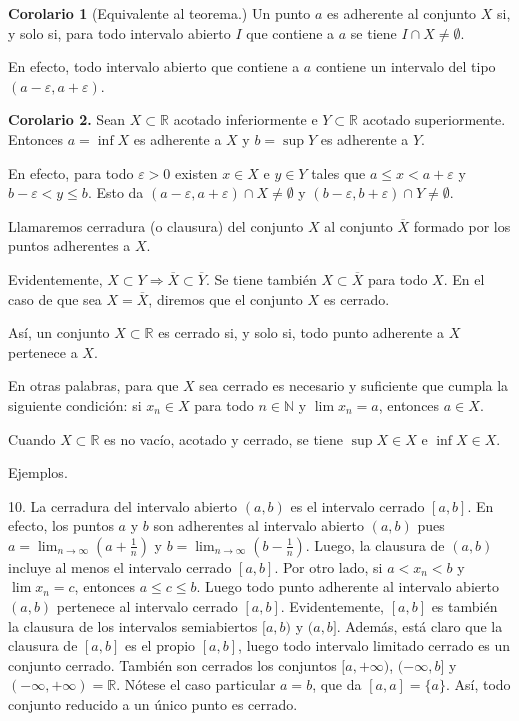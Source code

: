 \documentclass[12pt,oneside]{book}
\begin{document}
\textbf{Corolario 1} (Equivalente al teorema.) Un punto \( a \) es adherente al conjunto \( X \) si, y solo si, para todo intervalo abierto \( I \) que contiene a \( a \) se tiene \( I \cap X \neq \emptyset \).

En efecto, todo intervalo abierto que contiene a \( a \) contiene un intervalo del tipo \( (a - \varepsilon, a + \varepsilon) \).

\textbf{Corolario 2.} Sean \( X \subset \mathbb{R} \) acotado inferiormente e \( Y \subset \mathbb{R} \) acotado superiormente. Entonces \( a = \inf X \) es adherente a \( X \) y \( b = \sup Y \) es adherente a \( Y \).

En efecto, para todo \( \varepsilon > 0 \) existen \( x \in X \) e \( y \in Y \) tales que \( a \leq x < a + \varepsilon \) y \( b - \varepsilon < y \leq b \). Esto da \( (a - \varepsilon, a + \varepsilon) \cap X \neq \emptyset \) y \( (b - \varepsilon, b + \varepsilon) \cap Y \neq \emptyset \).

Llamaremos cerradura (o clausura) del conjunto \( X \) al conjunto \( \overline{X} \) formado por los puntos adherentes a \( X \).

Evidentemente, \( X \subset Y \Rightarrow \overline{X} \subset \overline{Y} \). Se tiene también \( X \subset \overline{X} \) para todo \( X \). En el caso de que sea \( X = \overline{X} \), diremos que el conjunto \( X \) es cerrado.

Así, un conjunto \( X \subset \mathbb{R} \) es cerrado si, y solo si, todo punto adherente a \( X \) pertenece a \( X \).

En otras palabras, para que \( X \) sea cerrado es necesario y suficiente que cumpla la siguiente condición: si \( x_n \in X \) para todo \( n \in \mathbb{N} \) y \( \lim x_n = a \), entonces \( a \in X \).

Cuando \( X \subset \mathbb{R} \) es no vacío, acotado y cerrado, se tiene \( \sup X \in X \) e \( \inf X \in X \).

Ejemplos.

10. La cerradura del intervalo abierto \( (a, b) \) es el intervalo cerrado \( [a, b] \). En efecto, los puntos \( a \) y \( b \) son adherentes al intervalo abierto \( (a, b) \) pues \( a = \lim_{n \to \infty} \left( a + \frac{1}{n} \right) \) y \( b = \lim_{n \to \infty} \left( b - \frac{1}{n} \right) \). Luego, la clausura de \((a, b)\) incluye al menos el intervalo cerrado \([a, b]\). Por otro lado, si \(a < x_n < b\) y \(\lim x_n = c\), entonces \(a \leq c \leq b\). Luego todo punto adherente al intervalo abierto \((a, b)\) pertenece al intervalo cerrado \([a, b]\). Evidentemente, \([a, b]\) es también la clausura de los intervalos semiabiertos \([a, b)\) y \((a, b]\). Además, está claro que la clausura de \([a, b]\) es el propio \([a, b]\), luego todo intervalo limitado cerrado es un conjunto cerrado. También son cerrados los conjuntos \([a, +\infty)\), \((-\infty, b]\) y \((-\infty, +\infty) = \mathbb{R}\). Nótese el caso particular \(a = b\), que da \([a, a] = \{a\}\). Así, todo conjunto reducido a un único punto es cerrado.
\end{document}

